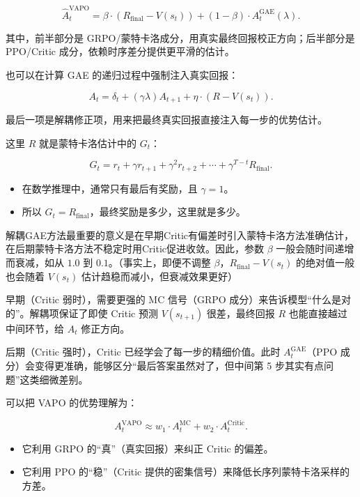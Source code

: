\[
\hat{A}_t^{\mathrm{VAPO}}
=
\beta\cdot(R_{\mathrm{final}}-V(s_t))
+
(1-\beta)\cdot A_t^{\mathrm{GAE}}(\lambda).
\]

其中，前半部分是 GRPO/蒙特卡洛成分，用真实最终回报校正方向；后半部分是 PPO/Critic 成分，依赖时序差分提供更平滑的估计。

也可以在计算 GAE 的递归过程中强制注入真实回报：

\[
A_t
=
\delta_t
+
(\gamma\lambda)A_{t+1}
+
\eta\cdot(R-V(s_t)).
\]

最后一项是解耦修正项，用来把最终真实回报直接注入每一步的优势估计。

这里 \(R\) 就是蒙特卡洛估计中的 \(G_t\)：

\[
G_t
=
r_t+\gamma r_{t+1}+\gamma^2 r_{t+2}
+\cdots+
\gamma^{T-t}R_{\mathrm{final}}.
\]

\begin{itemize}
\tightlist
\item
  在数学推理中，通常只有最后有奖励，且 \(\gamma=1\)。
\item
  所以 \(G_t=R_{\mathrm{final}}\)，最终奖励是多少，这里就是多少。
\end{itemize}

解耦GAE方法最重要的意义是在早期Critic有偏差时引入蒙特卡洛方法准确估计，在后期蒙特卡洛方法不稳定时用Critic促进收敛。因此，参数 \(\beta\) 一般会随时间递增而衰减，如从 \(1.0\) 到 \(0.1\)。（事实上，即便不调整 \(\beta\)，\(R_{\mathrm{final}}-V(s_t)\) 的绝对值一般也会随着 \(V(s_t)\) 估计趋稳而减小，但衰减效果更好）

早期（Critic 弱时），需要更强的 MC 信号（GRPO 成分）来告诉模型``什么是对的''。解耦项保证了即使 Critic 预测 \(V(s_{t+1})\) 很差，最终回报 \(R\) 也能直接越过中间环节，给 \(A_t\) 修正方向。

后期（Critic 强时），Critic 已经学会了每一步的精细价值。此时 \(A_t^{\mathrm{GAE}}\)（PPO 成分）会变得更准确，能够区分``最后答案虽然对了，但中间第 5 步其实有点问题''这类细微差别。

可以把 VAPO 的优势理解为：

\[
A_t^{\mathrm{VAPO}}
\approx
w_1\cdot A_t^{\mathrm{MC}}
+
w_2\cdot A_t^{\mathrm{Critic}}.
\]

\begin{itemize}
\tightlist
\item
  它利用 GRPO 的``真''（真实回报）来纠正 Critic 的偏差。
\item
  它利用 PPO 的``稳''（Critic 提供的密集信号）来降低长序列蒙特卡洛采样的方差。
\end{itemize}

